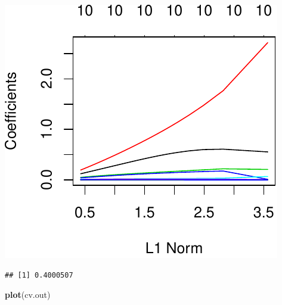 \documentclass[]{article}
\newenvironment{Shaded}{\begin{snugshade}}{\end{snugshade}}
\newcommand{\DataTypeTok}[1]{\textcolor[rgb]{0.13,0.29,0.53}{#1}}
\newcommand{\DecValTok}[1]{\textcolor[rgb]{0.00,0.00,0.81}{#1}}
\newcommand{\KeywordTok}[1]{\textcolor[rgb]{0.13,0.29,0.53}{\textbf{#1}}}
\newcommand{\NormalTok}[1]{#1}
\newcommand{\OperatorTok}[1]{\textcolor[rgb]{0.81,0.36,0.00}{\textbf{#1}}}
\newcommand{\StringTok}[1]{\textcolor[rgb]{0.31,0.60,0.02}{#1}}
\begin{document}
\begin{center}\includegraphics{sol_A4_files/figure-latex/unnamed-chunk-16-1} \end{center}

\begin{Shaded}
\end{Shaded}

\begin{verbatim}
## [1] 0.4000507
\end{verbatim}

\begin{Shaded}
\begin{Highlighting}[]
\KeywordTok{plot}\NormalTok{(cv.out)}
\end{Highlighting}
\end{Shaded}
\end{document}
